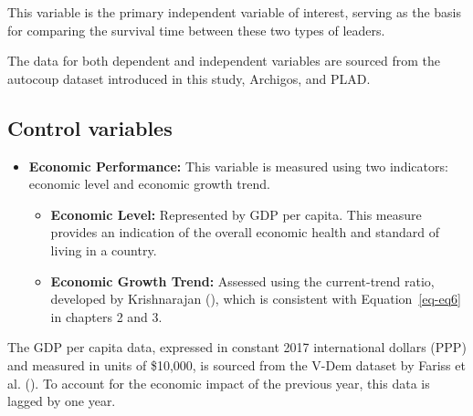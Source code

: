 \documentclass[
  12pt,
]{report}
\begin{document}
This variable is the primary independent variable of interest, serving
as the basis for comparing the survival time between these two types of
leaders.

The data for both dependent and independent variables are sourced from
the autocoup dataset introduced in this study, Archigos, and PLAD.

\subsection{Control variables}\label{control-variables-1}

\begin{itemize}
\item
  \textbf{Economic Performance:} This variable is measured using two
  indicators: economic level and economic growth trend.

  \begin{itemize}
  \item
    \textbf{Economic Level:} Represented by GDP per capita. This measure
    provides an indication of the overall economic health and standard
    of living in a country.
  \item
    \textbf{Economic Growth Trend:} Assessed using the current-trend
    ratio, developed by Krishnarajan
    (), which is consistent with
    Equation~\ref{eq-eq6} in chapters 2 and 3.
  \end{itemize}
\end{itemize}

The GDP per capita data, expressed in constant 2017 international
dollars (PPP) and measured in units of \$10,000, is sourced from the
V-Dem dataset by Fariss et al. (). To
account for the economic impact of the previous year, this data is
lagged by one year.
\end{document}
